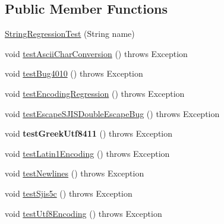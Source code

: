 \subsection*{Public Member Functions}
\begin{DoxyCompactItemize}
\item 
\mbox{\hyperlink{classtestsuite_1_1regression_1_1_string_regression_test_a74cdd190073561c8807d281869ac10c5}{String\+Regression\+Test}} (String name)
\item 
void \mbox{\hyperlink{classtestsuite_1_1regression_1_1_string_regression_test_a5a8cfa1befdedece1a323e0b37658e39}{test\+Ascii\+Char\+Conversion}} ()  throws Exception 
\item 
void \mbox{\hyperlink{classtestsuite_1_1regression_1_1_string_regression_test_aab8671e0e1b8917318be7da4af2acfd5}{test\+Bug4010}} ()  throws Exception 
\item 
void \mbox{\hyperlink{classtestsuite_1_1regression_1_1_string_regression_test_a38cab96afa2172965f228e78ad15fdec}{test\+Encoding\+Regression}} ()  throws Exception 
\item 
void \mbox{\hyperlink{classtestsuite_1_1regression_1_1_string_regression_test_aed5d3525cb076428271b0166d5537e83}{test\+Escape\+S\+J\+I\+S\+Double\+Escape\+Bug}} ()  throws Exception 
\item 
\mbox{\label{classtestsuite_1_1regression_1_1_string_regression_test_a8a0195ab620f64bccaf9f34841536e70}} 
void {\bfseries test\+Greek\+Utf8411} ()  throws Exception 
\item 
void \mbox{\hyperlink{classtestsuite_1_1regression_1_1_string_regression_test_abcc37c5fb4c57b3f201afaadbc55ee13}{test\+Latin1\+Encoding}} ()  throws Exception 
\item 
void \mbox{\hyperlink{classtestsuite_1_1regression_1_1_string_regression_test_a5e1296ac09b9d40f0116a776de542e0a}{test\+Newlines}} ()  throws Exception 
\item 
void \mbox{\hyperlink{classtestsuite_1_1regression_1_1_string_regression_test_a79556638c7ab71bef596c339006c2e19}{test\+Sjis5c}} ()  throws Exception 
\item 
void \mbox{\hyperlink{classtestsuite_1_1regression_1_1_string_regression_test_a4f3f125a39d60c4abe46d69db6002ede}{test\+Utf8\+Encoding}} ()  throws Exception 
\item 
\mbox{\label{classtestsuite_1_1regression_1_1_string_regression_test_a7029c28b203cd6e7cb1b64d78f8d1c26}} 

\end{DoxyCompactItemize}
